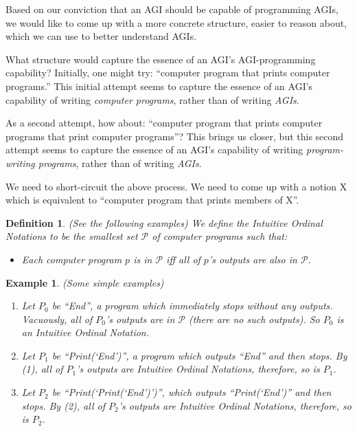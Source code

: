 \documentclass[runningheads]{llncs}
\newtheorem{myexample}[mytheorem]{Example}
\newtheorem{mydefinition}[mytheorem]{Definition}
\begin{document}
Based on our conviction that an AGI should be capable of programming AGIs,
we would like to come up with a more concrete structure, easier to reason
about, which we can use to better understand AGIs.

What structure would capture the essence of an AGI's AGI-programming
capability? Initially, one might try: ``computer
program that prints computer programs.'' This initial attempt seems to
capture the essence of an
AGI's capability of writing \emph{computer programs}, rather than of writing \emph{AGIs}.

As a second attempt, how
about: ``computer program that prints computer programs that print
computer programs''? This brings us closer, but this second attempt
seems to capture the essence of an AGI's capability of writing \emph{program-writing programs},
rather than of writing \emph{AGIs}.

We need to short-circuit the above process. We need to come up with a notion
X which is equivalent to ``computer program that prints members of X''.

\begin{mydefinition}
\label{literalnotationdef}
    (See the following examples)
    We define the Intuitive Ordinal Notations to be the smallest set $\mathcal P$
    of computer programs such that:
    \begin{itemize}
        \item
            Each computer program $p$ is in $\mathcal P$ iff all of
            $p$'s outputs are also in $\mathcal P$.
    \end{itemize}
\end{mydefinition}

\begin{myexample}
\label{simpleexamples}
(Some simple examples)
    \begin{enumerate}
    \item
    Let $P_0$ be ``End'', a program which immediately stops without any outputs.
    Vacuously, all of $P_0$'s outputs are in $\mathcal P$
    (there are no such outputs). So $P_0$ is an Intuitive Ordinal Notation.
    \item
    Let $P_1$ be ``Print(`End')'', a program which outputs ``End'' and then
    stops. By (1), all of $P_1$'s outputs are Intuitive Ordinal Notations,
    therefore, so is $P_1$.
    \item
    Let $P_2$ be ``Print(`Print(`End')')'', which outputs ``Print(`End')'' and then
    stops. By (2), all of $P_2$'s outputs are Intuitive Ordinal Notations,
    therefore, so is $P_2$.
    \end{enumerate}
\end{myexample}
\end{document}
